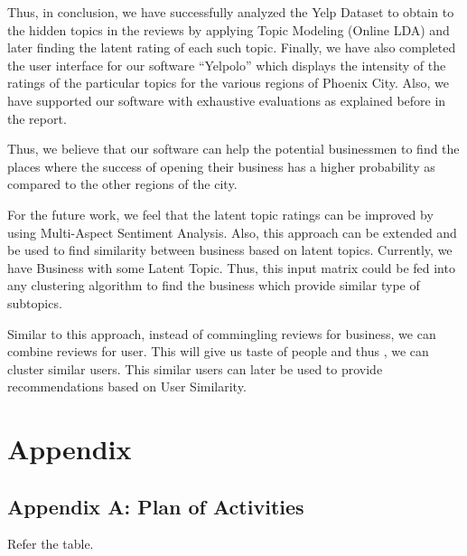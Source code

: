 \documentclass[12pt]{article} %
\begin{document}
Thus, in conclusion, we have successfully analyzed the Yelp Dataset to obtain to the hidden topics in the reviews by applying Topic Modeling (Online LDA) and later finding the latent rating of each such topic. Finally, we have also completed the user interface for our software ``Yelpolo'' which displays the intensity of the ratings of the particular topics for the various regions of Phoenix City. Also, we have supported our software with exhaustive evaluations as explained before in the report.

Thus, we believe that our software can help the potential businessmen to find the places where the success of opening their business has a higher probability as compared to the other regions of the city. 

For the future work, we feel that the latent topic ratings can be improved by using Multi-Aspect Sentiment Analysis. 
Also, this approach can be extended and  be used to find similarity between business based on latent topics. Currently, we have Business with some Latent Topic. Thus, this input matrix could be fed into any clustering algorithm to find the business which provide similar type of subtopics.

Similar to this approach, instead of commingling reviews for business, we can combine reviews for user. This will give us taste of people and thus , we can cluster similar users. This similar users can later be used to provide recommendations based on User Similarity.

\section{Appendix}

\subsection{Appendix A: Plan of Activities}

Refer the table.
\end{document}
